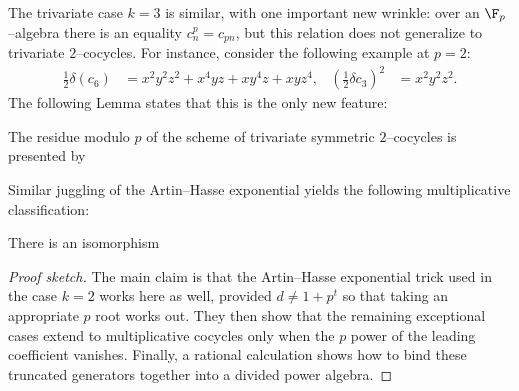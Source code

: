 The trivariate case \(k = 3\) is similar, with one important new wrinkle: over an \(\F_p\)--algebra there is an equality \(c_n^p = c_{pn}\), but this relation does not generalize to trivariate \(2\)--cocycles.  For instance, consider the following example at \(p = 2\):
\begin{align*}
\frac{1}{2} \delta (c_6) & = x^2 y^2 z^2 + x^4 y z + x y^4 z + x y z^4, &
\left(\frac{1}{2} \delta c_3\right)^2 & = x^2 y^2 z^2.
\end{align*}
The following Lemma states that this is the only new feature:
\begin{lemma}
\pushQED{\qed}
The residue modulo \(p\) of the scheme of trivariate symmetric \(2\)--cocycles is presented by
\begin{center}
\end{center}
\end{lemma}

\noindent Similar juggling of the Artin--Hasse exponential yields the following multiplicative classification:
\begin{theorem}\label{AHSCalculationOfC3}
There is an isomorphism
\begin{center}
\end{center}
\end{theorem}
\begin{proof}[Proof sketch]
The main claim is that the Artin--Hasse exponential trick used in the case \(k = 2\) works here as well, provided \(d \ne 1 + p^t\) so that taking an appropriate \(p\){\th} root works out.  They then show that the remaining exceptional cases extend to multiplicative cocycles only when the \(p\){\th} power of the leading coefficient vanishes.  Finally, a rational calculation shows how to bind these truncated generators together into a divided power algebra.
\end{proof}

